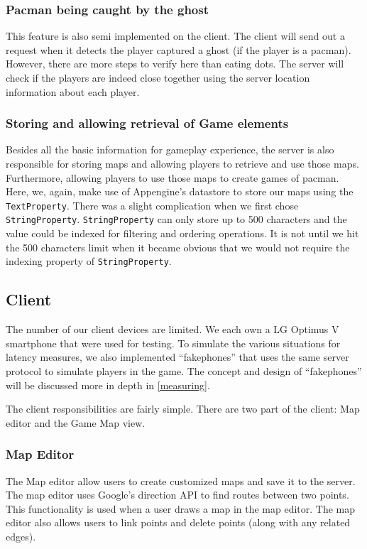 \documentclass{acm_proc_article-sp}
\begin{document}
\subsubsection{Pacman being caught by the ghost}
This feature is also semi implemented on the client. The client will
send out a request when it detects the player captured a ghost (if the
player is a pacman). However, there are more steps to verify here than
eating dots. The server will check if the players are indeed close
together using the server location information about each player.

\subsubsection{Storing and allowing retrieval of Game elements}
Besides all the basic information for gameplay experience, the server
is also responsible for storing maps and allowing players to retrieve
and use those maps. Furthermore, allowing players to use those maps to
create games of pacman. Here, we, again, make use of Appengine's
datastore to store our maps using the \texttt{TextProperty}. There was
a slight complication when we first chose
\texttt{StringProperty}. \texttt{StringProperty} can only store up to
500 characters and the value could be indexed for filtering and
ordering operations. It is not until we hit the 500 characters limit
when it became obvious that we would not require the indexing property
of \texttt{StringProperty}.


\subsection{Client}

The number of our client devices are limited. We each own a LG Optimus
V smartphone that were used for testing. To simulate the various
situations for latency measures, we also implemented ``fakephones''
that uses the same server protocol to simulate players in the
game. The concept and design of ``fakephones'' will be discussed more
in depth in \ref{measuring}.

The client responsibilities are fairly simple. There are two part of
the client: Map editor and the Game Map view.

\subsubsection{Map Editor}
The Map editor allow users to create customized maps and save it to
the server. The map editor uses Google's direction API
\cite{GoogleDirection} to find routes between two points. This
functionality is used when a user draws a map in the map editor. The
map editor also allows users to link points and delete points (along
with any related edges).
\end{document}
